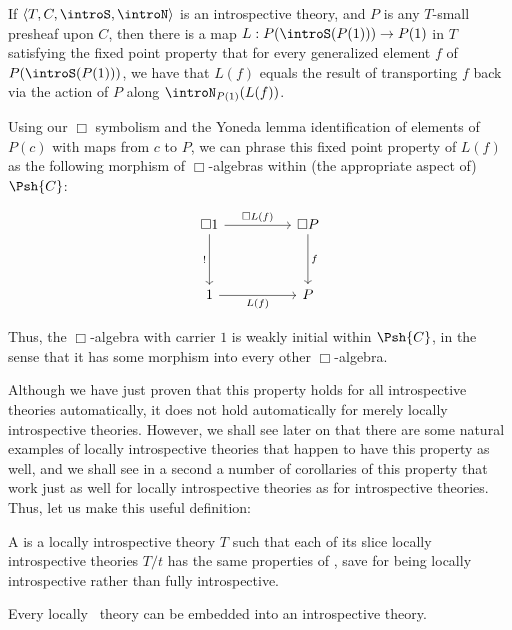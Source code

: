 \label{LoebInIntrosp}
If $\langle T, C, \introS, \introN \rangle$ is an introspective theory, and $P$ is any $T$-small presheaf upon $C$, then there is a map $L : P(\introS(P(1))) \to P(1)$ in $T$ satisfying the fixed point property that for every generalized element $f$ of $P(\introS(P(1)))$, we have that $L(f)$ equals the result of transporting $f$ back via the action of $P$ along $\introN_{P(1)}(L(f))$.

Using our $\Box$ symbolism and the Yoneda lemma identification of elements of $P(c)$ with maps from $c$ to $P$, we can phrase this fixed point property of $L(f)$ as the following morphism of $\Box$-algebras within (the appropriate aspect of) $\Psh{C}$:

\[\begin{tikzcd}
	{\Box 1} && {\Box P} \\
	\\
	1 && P
	\arrow["f", from=1-3, to=3-3]
	\arrow["{!}"', from=1-1, to=3-1]
	\arrow["{\Box L(f)}", from=1-1, to=1-3]
	\arrow["{L(f)}"', from=3-1, to=3-3]
\end{tikzcd}\]

Thus, the $\Box$-algebra with carrier $1$ is weakly initial within $\Psh{C}$, in the sense that it has some morphism into every other $\Box$-algebra.

Although we have just proven that this property holds for all introspective theories automatically, it does not hold automatically for merely locally introspective theories. However, we shall see later on that there are some natural examples of locally introspective theories that happen to have this property as well, and we shall see in a second a number of corollaries of this property that work just as well for locally introspective theories as for introspective theories. Thus, let us make this useful definition:

\begin{definition}
A  is a locally introspective theory $T$ such that each of its slice locally introspective theories $T/t$ has the same properties of , save for being locally introspective rather than fully introspective.
\end{definition}

\begin{conjecture}
Every locally \Loeb\ theory can be embedded into an introspective theory.
\end{conjecture}

